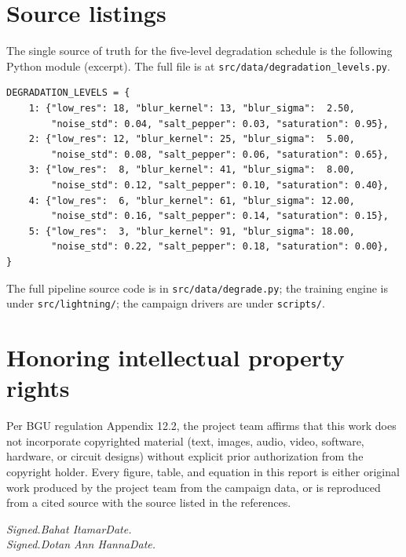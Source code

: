 
\section{Source listings}
\label{app:listings}

The single source of truth for the five-level degradation schedule is the
following Python module (excerpt). The full file is at
\texttt{src/data/degradation\_levels.py}.

\begin{small}\begin{verbatim}
DEGRADATION_LEVELS = {
    1: {"low_res": 18, "blur_kernel": 13, "blur_sigma":  2.50,
        "noise_std": 0.04, "salt_pepper": 0.03, "saturation": 0.95},
    2: {"low_res": 12, "blur_kernel": 25, "blur_sigma":  5.00,
        "noise_std": 0.08, "salt_pepper": 0.06, "saturation": 0.65},
    3: {"low_res":  8, "blur_kernel": 41, "blur_sigma":  8.00,
        "noise_std": 0.12, "salt_pepper": 0.10, "saturation": 0.40},
    4: {"low_res":  6, "blur_kernel": 61, "blur_sigma": 12.00,
        "noise_std": 0.16, "salt_pepper": 0.14, "saturation": 0.15},
    5: {"low_res":  3, "blur_kernel": 91, "blur_sigma": 18.00,
        "noise_std": 0.22, "salt_pepper": 0.18, "saturation": 0.00},
}
\end{verbatim}\end{small}

The full pipeline source code is in \texttt{src/data/degrade.py}; the
training engine is under \texttt{src/lightning/}; the campaign drivers are
under \texttt{scripts/}.

\section{Honoring intellectual property rights}
\label{app:ip}

Per BGU regulation Appendix 12.2, the project team affirms that this work
does not incorporate copyrighted material (text, images, audio, video,
software, hardware, or circuit designs) without explicit prior
authorization from the copyright holder. Every figure, table, and
equation in this report is either original work produced by the project
team from the campaign data, or is reproduced from a cited source with
the source listed in the references.

\vspace{1em}
\noindent
\textit{Signed.\quad Bahat Itamar\quad\dotfill\quad Date.\quad\dotfill}\\
\textit{Signed.\quad Dotan Ann Hanna\quad\dotfill\quad Date.\quad\dotfill}
